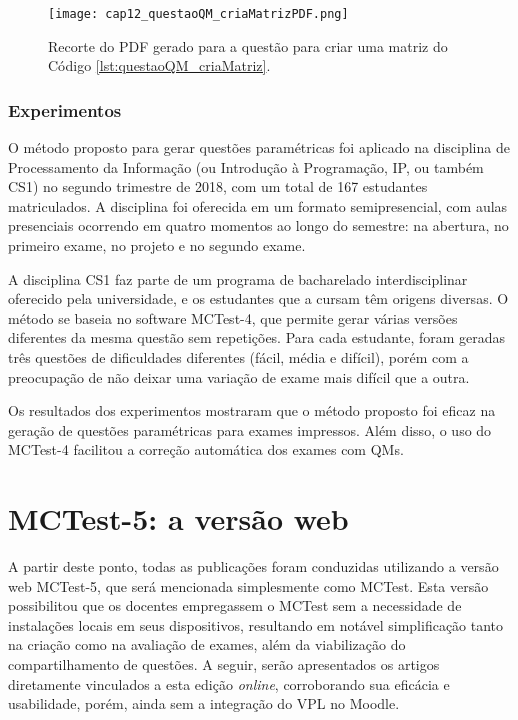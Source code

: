 \begin{figure}[!ht]
  \texttt{[image: cap12\_questaoQM\_criaMatrizPDF.png]}
  \caption{Recorte do PDF gerado para a questão para criar uma matriz do Código \ref{lst:questaoQM_criaMatriz}.}
  \label{fig:cap12_questaoQM_criaMatrizPDF}
\end{figure}

\subsubsection{Experimentos}

O método proposto para gerar questões paramétricas foi aplicado na disciplina de Processamento da Informação (ou Introdução à Programação, IP, ou também CS1) no segundo trimestre de 2018, com um total de 167 estudantes matriculados. A disciplina foi oferecida em um formato semipresencial, com aulas presenciais ocorrendo em quatro momentos ao longo do semestre: na abertura, no primeiro exame, no projeto e no segundo exame.

A disciplina CS1 faz parte de um programa de bacharelado interdisciplinar oferecido pela universidade, e os estudantes que a cursam têm origens diversas. O método se baseia no software MCTest-4, que permite gerar várias versões diferentes da mesma questão sem repetições. Para cada estudante, foram geradas três questões de dificuldades diferentes (fácil, média e difícil), porém com a preocupação de não deixar uma variação de exame mais difícil que a outra.

Os resultados dos experimentos mostraram que o método proposto foi eficaz na geração de questões paramétricas para exames impressos. Além disso, o uso do MCTest-4 facilitou a correção automática dos exames com QMs.


\section{MCTest-5: a versão web}

A partir deste ponto, todas as publicações foram conduzidas utilizando a versão web MCTest-5, que será mencionada simplesmente como MCTest. Esta versão possibilitou que os docentes empregassem o MCTest sem a necessidade de instalações locais em seus dispositivos, resultando em notável simplificação tanto na criação como na avaliação de exames, além da viabilização do compartilhamento de questões. A seguir, serão apresentados os artigos diretamente vinculados a esta edição \textit{online}, corroborando sua eficácia e usabilidade, porém, ainda sem a integração do VPL no Moodle.

